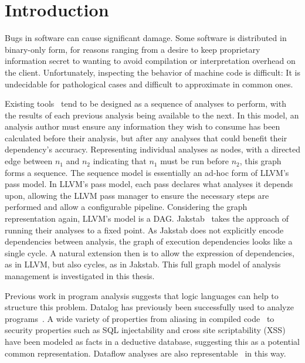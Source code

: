\chapter{Introduction}
Bugs in software can cause significant damage.
Some software is distributed in binary-only form, for reasons ranging from a desire to keep proprietary information secret to wanting to avoid compilation or interpretation overhead on the client.
Unfortunately, inspecting the behavior of machine code is difficult:
It is undecidable for pathological cases and difficult to approximate in common ones.

Existing tools~\cite{ida, bap, bitblaze, bindead} tend to be designed as a sequence of analyses to perform, with the results of each previous analysis being available to the next.
In this model, an analysis author must ensure any information they wish to consume has been calculated before their analysis, but after any analyses that could benefit their dependency's accuracy.
Representing individual analyses as nodes, with a directed edge between $n_1$ and $n_2$ indicating that $n_1$ must be run before $n_2$, this graph forms a sequence.
The sequence model is essentially an ad-hoc form of LLVM\cite{llvm}'s pass model.
In LLVM's pass model, each pass declares what analyses it depends upon, allowing the LLVM pass manager to ensure the necessary steps are performed and allow a configurable pipeline.
Considering the graph representation again, LLVM's model is a DAG.
Jakstab~\cite{jakstab} takes the approach of running their analyses to a fixed point.
As Jakstab does not explicitly encode dependencies between analysis, the graph of execution dependencies looks like a single cycle.
A natural extension then is to allow the expression of dependencies, as in LLVM, but also cycles, as in Jakstab.
This full graph model of analysis management is investigated in this thesis.

Previous work in program analysis suggests that logic languages can help to structure this problem.
Datalog has previously been successfully used to analyze programs~\cite{lam2005,brumley2006,alpuente2011,doop1,bddbddb}.
A wide variety of properties from aliasing in compiled code~\cite{brumley2006} to security properties such as SQL injectability and cross site scriptability (XSS)~\cite{lam2005} have been modeled as facts in a deductive database, suggesting this as a potential common representation.
Dataflow analyses are also representable~\cite{mcallester2002} in this way.

